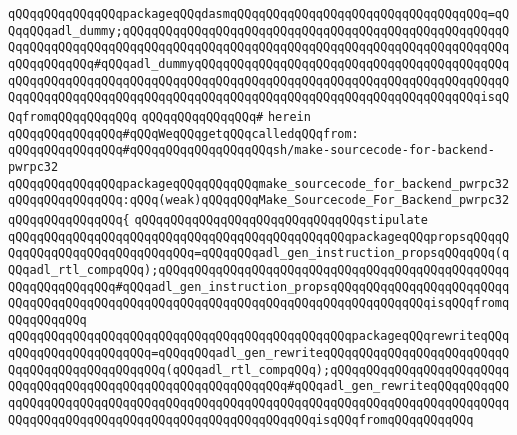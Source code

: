 \verb|qQQqqQQqqQQqqQQqpackageqQQqdasmqQQqqQQqqQQqqQQqqQQqqQQqqQQqqQQqqQQq=qQQqqQQqadl_dummy;qQQqqQQqqQQqqQQqqQQqqQQqqQQqqQQqqQQqqQQqqQQqqQQqqQQqqQQqqQQqqQQqqQQqqQQqqQQqqQQqqQQqqQQqqQQqqQQqqQQqqQQqqQQqqQQqqQQqqQQqqQQqqQQqqQQqqQQq#qQQqadl_dummyqQQqqQQqqQQqqQQqqQQqqQQqqQQqqQQqqQQqqQQqqQQqqQQqqQQqqQQqqQQqqQQqqQQqqQQqqQQqqQQqqQQqqQQqqQQqqQQqqQQqqQQqqQQqqQQqqQQqqQQqqQQqqQQqqQQqqQQqqQQqqQQqqQQqqQQqqQQqqQQqqQQqqQQqqQQqqQQqqQQqisqQQqfromqQQqqQQqqQQq|\newline
\verb|qQQqqQQqqQQqqQQq#|\newline
\verb|herein|\newline
\newline
\newline
\verb|qQQqqQQqqQQqqQQq#qQQqWeqQQqgetqQQqcalledqQQqfrom:|\newline
\verb|qQQqqQQqqQQqqQQq#qQQqqQQqqQQqqQQqqQQqsh/make-sourcecode-for-backend-pwrpc32|\newline
\newline
\verb|qQQqqQQqqQQqqQQqpackageqQQqqQQqqQQqmake_sourcecode_for_backend_pwrpc32|\newline
\verb|qQQqqQQqqQQqqQQq:qQQq(weak)qQQqqQQqMake_Sourcecode_For_Backend_pwrpc32|\newline
\verb|qQQqqQQqqQQqqQQq{|\newline
\verb|qQQqqQQqqQQqqQQqqQQqqQQqqQQqqQQqstipulate|\newline
\verb|qQQqqQQqqQQqqQQqqQQqqQQqqQQqqQQqqQQqqQQqqQQqqQQqpackageqQQqpropsqQQqqQQqqQQqqQQqqQQqqQQqqQQqqQQq=qQQqqQQqadl_gen_instruction_propsqQQqqQQq(qQQqadl_rtl_compqQQq);qQQqqQQqqQQqqQQqqQQqqQQqqQQqqQQqqQQqqQQqqQQqqQQqqQQqqQQqqQQqqQQq#qQQqadl_gen_instruction_propsqQQqqQQqqQQqqQQqqQQqqQQqqQQqqQQqqQQqqQQqqQQqqQQqqQQqqQQqqQQqqQQqqQQqqQQqqQQqqQQqqQQqisqQQqfromqQQqqQQqqQQq|\newline
\verb|qQQqqQQqqQQqqQQqqQQqqQQqqQQqqQQqqQQqqQQqqQQqqQQqpackageqQQqrewriteqQQqqQQqqQQqqQQqqQQqqQQq=qQQqqQQqadl_gen_rewriteqQQqqQQqqQQqqQQqqQQqqQQqqQQqqQQqqQQqqQQqqQQqqQQq(qQQqadl_rtl_compqQQq);qQQqqQQqqQQqqQQqqQQqqQQqqQQqqQQqqQQqqQQqqQQqqQQqqQQqqQQqqQQqqQQq#qQQqadl_gen_rewriteqQQqqQQqqQQqqQQqqQQqqQQqqQQqqQQqqQQqqQQqqQQqqQQqqQQqqQQqqQQqqQQqqQQqqQQqqQQqqQQqqQQqqQQqqQQqqQQqqQQqqQQqqQQqqQQqqQQqqQQqqQQqisqQQqfromqQQqqQQqqQQq|\newline
